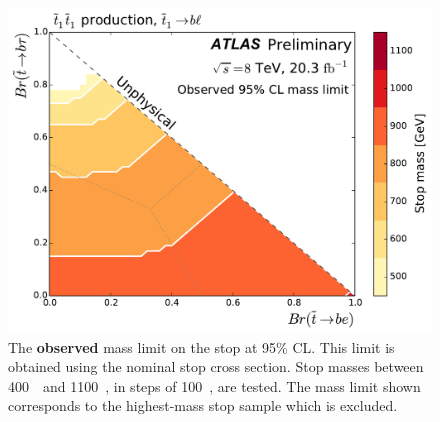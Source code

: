 \begin{figure}[p]
  \centering
  \includegraphics[width=\textwidth]
  {figs/blstop/mass_limit_contours_no_extras_obs.pdf}
  \caption[
    The \textbf{observed} mass limit on the stop at 95\% CL.
  ]{
    The \textbf{observed} mass limit on the stop at 95\% CL.
    This limit is obtained using the nominal stop cross section.
    Stop masses between 400~\GeV\ and 1100~\GeV, in steps of 100~\GeV, are
    tested.
    The mass limit shown corresponds to the highest-mass stop sample which is
    excluded.
  }
  \label{fig:mass_limit_obs}
\end{figure}


